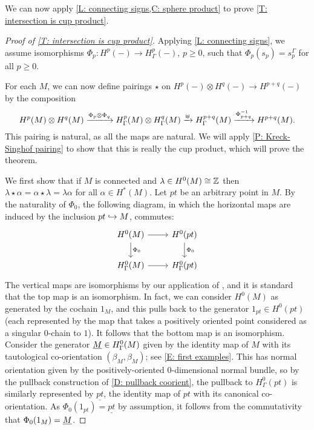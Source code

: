 We can now apply \cref{L: connecting signs,C: sphere product} to prove \cref{T: intersection is cup product}.

\begin{proof}[Proof of \cref{T: intersection is cup product}]
	Applying \cref{L: connecting signs}, we assume isomorphisms $\Phi_p \colon H^p(-) \to H^p_\Gamma(-)$, $p \geq 0$, such that $\Phi_p(s_p) = s_p^\Gamma$ for all $p \geq 0$.

	For each $M$, we can now define pairings $\star$ on $H^p(-) \otimes H^q(-) \to H^{p+q}(-)$ by the composition
	\[
	H^p(M) \otimes H^q(M) \xrightarrow{\Phi_p \otimes \Phi_q}
	H^p_\Gamma(M) \otimes H^q_\Gamma(M) \xrightarrow{\uplus}
	H^{p+q}_\Gamma(M) \xrightarrow{\Phi_{p+q}^{-1}}
	H^{p+q}(M).
	\]
	This pairing is natural, as all the maps are natural.
	We will apply \cref{P: Kreck-Singhof pairing} to show that this is really the cup product, which will prove the theorem.

	We first show that if $M$ is connected and $\lambda \in H^0(M) \cong \mathbb{Z}$ then $\lambda\star \alpha = \alpha\star \lambda = \lambda\alpha$ for all $\alpha \in H^*(M)$.
	Let $pt$ be an arbitrary point in $M$.
	By the naturality of $\Phi_0$, the following diagram, in which the horizontal maps are induced by the inclusion $pt \hookrightarrow M$, commutes:
	\[
	\begin{tikzcd}
		H^0(M) \arrow{r} \arrow[d, "\Phi_0"] & H^0(pt) \arrow[d, "\Phi_0"] \\
		H_\Gamma^0(M) \arrow{r} & H_\Gamma^0(pt)
	\end{tikzcd}
	\]
	The vertical maps are isomorphisms by our application of \cite[Theorem 10]{Krec10b}, and it is standard that the top map is an isomorphism.
	In fact, we can consider $H^0(M)$ as generated by the cochain $1_M$, and this pulls back to the generator $1_{pt} \in H^0(pt)$ (each represented by the map that takes a positively oriented point considered as a singular $0$-chain to $1$).
	It follows that the bottom map is an isomorphism.
	Consider the generator $\underline{M} \in H_\Gamma^0(M)$ given by the identity map of $M$ with its tautological co-orientation $(\beta_M,\beta_M)$; see \cref{E: first examples}.
	This has normal orientation given by the positively-oriented $0$-dimensional normal bundle, so by the pullback construction of \cref{D: pullback coorient}, the pullback to $H^0_\Gamma(pt)$ is similarly represented by $\underline{pt}$, the identity map of $pt$ with its canonical co-orientation.
	As $\Phi_0(1_{pt}) = \underline{pt}$ by assumption, it follows from the commutativity that $\Phi_0(1_M) = \underline{M}$.


\end{proof}
